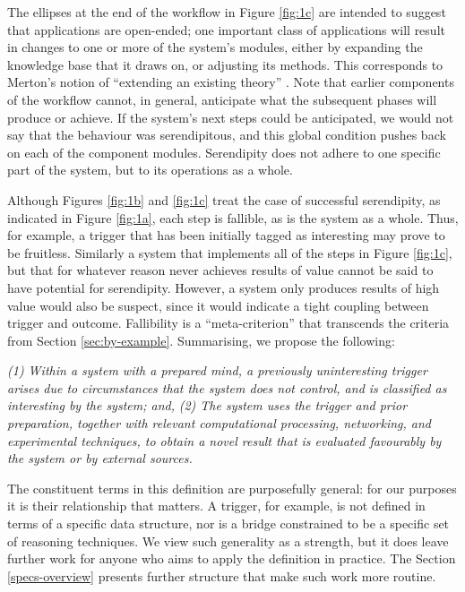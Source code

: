 The ellipses at the end of the workflow in Figure \ref{fig:1c} are
intended to suggest that applications are open-ended; one
important class of applications will result in changes to one or more
of the system's modules, either by expanding the knowledge base
that it draws on, or adjusting its methods.
This corresponds to Merton's notion of ``extending an existing theory''
\cite{merton1948bearing}.
Note that earlier components of the workflow
cannot, in general, anticipate what the subsequent phases will produce
or achieve.  If the system's next steps could be anticipated, we would
not say that the behaviour was serendipitous, and this global condition pushes back on each of the component modules.  
Serendipity does not adhere to one specific part of the system, but to
its operations as a whole.  

Although Figures  \ref{fig:1b} and  \ref{fig:1c}
treat the case of successful serendipity, as indicated in Figure
 \ref{fig:1a}, each step is fallible, as is the system as a whole.
Thus, for example, a trigger that has been initially tagged as interesting may prove to be fruitless.
Similarly a system that implements all of the steps in Figure \ref{fig:1c}, but that for whatever reason never
achieves results of value cannot be said to have potential for serendipity.
However, a system only produces results of high value would also be
suspect, since it would indicate a tight coupling between trigger
and outcome.  Fallibility is a ``meta-criterion'' that transcends the criteria from Section \ref{sec:by-example}.
Summarising, we propose the following:


\begin{mdframed}
\begin{ndef}\label{def:serendipity}
\emph{(1) Within a system with a prepared mind, a previously uninteresting trigger arises due to circumstances that the system does not control, and is classified as interesting by the system; and,}
\emph{(2) The system uses the trigger and prior preparation, together with relevant computational processing, networking, and experimental techniques, to obtain a novel result that is evaluated favourably by the system or by external sources.}
\end{ndef}
\end{mdframed}

The constituent terms in this definition are purposefully general: for
our purposes it is their relationship that matters.  A trigger, for
example, is not defined in terms of a specific data structure, nor is
a bridge constrained to be a specific set of reasoning techniques.  We
view such generality as a strength, but it does leave further work for
anyone who aims to apply the definition in practice.  The Section
\ref{specs-overview} presents further structure that make such work
more routine.


